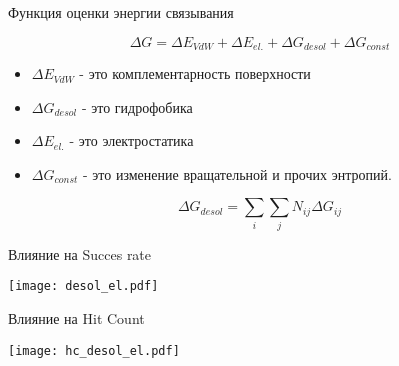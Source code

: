   \begin{frame}{Функция оценки энергии связывания}

      \[ \Delta G = \Delta E_{VdW} + \Delta E_{el.}+ \Delta G_{desol} +\Delta G_{const} \]

      \begin{itemize}
          \item $\Delta E_{VdW}$ - это комплементарность поверхности
          \item $\Delta G_{desol}$ - это гидрофобика
          \item $\Delta E_{el.}$ - это электростатика
          \item $\Delta G_{const}$ - это изменение вращательной и прочих энтропий.
          \end{itemize}

          \[  \Delta G_{desol}= \sum_i \sum_j N_{ij}\Delta G_{ij} \]
      \end{frame}

      \begin{frame}{Влияние на Succes rate}
      \begin{center}
          \texttt{[image: desol\_el.pdf]}

            \end{center}

      \end{frame}
      \begin{frame}{Влияние на Hit Count}
      \begin{center}
          \texttt{[image: hc\_desol\_el.pdf]}

            \end{center}

      \end{frame}


      

